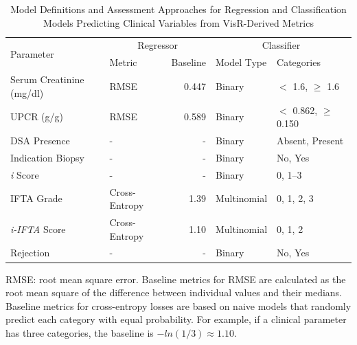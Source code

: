 
\begin{table}[tbp]
    \centering
    \caption{Model Definitions and Assessment Approaches for Regression and Classification Models Predicting Clinical Variables from VisR-Derived Metrics}
    \begin{tabular}{llrll}
        \toprule
        \multirow{2}{*}{Parameter} & 
        \multicolumn{2}{c}{Regressor} & 
        \multicolumn{2}{c}{Classifier}\\
         & Metric & Baseline & Model Type & Categories\\
        \midrule
        Serum Creatinine (mg/dl) &
        RMSE & 0.447 &
        Binary & $<$ 1.6, $\geq$ 1.6\\
        UPCR (g/g) &
        RMSE & 0.589 &
        Binary & $<$ 0.862, $\geq$ 0.150\\
        DSA Presence &
        - & - &
        Binary & Absent, Present\\
        Indication Biopsy &
        - & - &
        Binary & No, Yes\\
        \emph{i} Score &
        - & - &
        Binary & 0, 1--3\\
        IFTA Grade &
        Cross-Entropy & 1.39 &
        Multinomial & 0, 1, 2, 3\\
        \emph{i-IFTA} Score &
        Cross-Entropy & 1.10 &
        Multinomial & 0, 1, 2\\
        Rejection &
        - & - &
        Binary & No, Yes\\
        \bottomrule
    \end{tabular}
    \par\vspace{0.5em}
    \noindent{}RMSE: root mean square error. Baseline metrics for RMSE are calculated as the root mean square of the difference between individual values and their medians. Baseline metrics for cross-entropy losses are based on naive models that randomly predict each category with equal probability. For example, if a clinical parameter has three categories, the baseline is $-ln \left( 1 / 3 \right) \approx 1.10$.
    \label{tbl:clinicalVariables}
\end{table}
